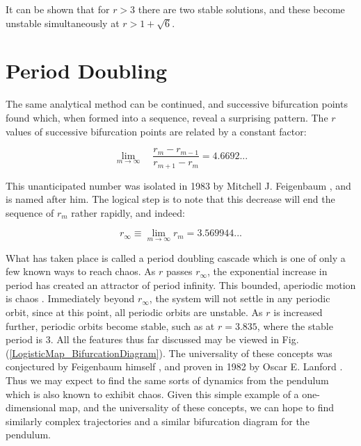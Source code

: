 \documentclass[12pt,twoside]{reedthesis}
\begin{document}
It can be shown \cite{strogatz1994} that for $r > 3$ there are two stable solutions, and these become unstable simultaneously at $r > 1 + \sqrt{6}$.  

\section{Period Doubling}

The same analytical method can be continued, and successive bifurcation points found which, when formed into a sequence, reveal a surprising pattern.  The $r$ values of successive bifurcation points are related by a constant factor: 

\begin{equation}
\label{period_doubling_feigenbaum}
\lim_{m \rightarrow \infty} \quad \frac{r_m - r_{m-1}}{r_{m+1}-r_m} = 4.6692...
\end{equation}

This unanticipated number was isolated in 1983 by Mitchell J. Feigenbaum \cite{feigenbaum1983}, and is named after him.  The logical step is to note that this decrease will end the sequence of $r_m$ rather rapidly, and indeed: 

\begin{equation}
\label{period_doubling_cascade}
r_\infty  \equiv \lim_{m \rightarrow \infty} r_m = 3.569944...
\end{equation}

What has taken place is called a period doubling cascade which is one of only a few known ways to reach chaos.  As $r$ passes $r_\infty$, the exponential increase in period has created an attractor of period infinity.  This bounded, aperiodic motion is chaos \cite{may1976}.  Immediately beyond $r_\infty$, the system will not settle in any periodic orbit, since at this point, all periodic orbits are unstable. As $r$ is increased further, periodic orbits become stable, such as at $r = 3.835$, where the stable period is 3.  All the features thus far discussed may be viewed in Fig. (\ref{LogisticMap_BifurcationDiagram}).  The universality of these concepts was conjectured by Feigenbaum himself \cite{feigenbaum1983}, and proven in 1982 by Oscar E. Lanford \cite{lanford1982}.  Thus we may expect to find the same sorts of dynamics from the pendulum which is also known to exhibit chaos.  Given this simple example of a one-dimensional map, and the universality of these concepts, we can hope to find similarly complex trajectories and a similar bifurcation diagram for the pendulum.   
\end{document}
